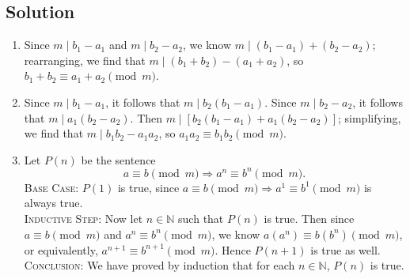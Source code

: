 \documentclass{article}
\begin{document}
\subsection*{Solution}
    \begin{enumerate}
        \item Since $m \mid b_1 - a_1$ and $m \mid b_2 - a_2$, we know $m \mid (b_1 - a_1) + (b_2 - a_2)$; rearranging, we find that $m \mid (b_1 + b_2) - (a_1 + a_2)$, so $b_1 + b_2 \equiv a_1 + a_2 \pmod m$.
        \item Since $m \mid b_1 - a_1$, it follows that $m \mid b_2(b_1 - a_1)$. Since $m \mid b_2 - a_2$, it follows that $m \mid a_1(b_2 - a_2)$. Then $m \mid [b_2(b_1 - a_1) + a_1(b_2 - a_2)]$; simplifying, we find that $m \mid b_1b_2 - a_1a_2$, so $a_1a_2 \equiv b_1b_2 \pmod{m}$.
        \item Let $P(n)$ be the sentence $$a \equiv b \pmod m \Rightarrow a^n \equiv b^n \pmod m.$$
        \textsc{Base Case}: $P(1)$ is true, since $a \equiv b \pmod m \Rightarrow a^1 \equiv b^1 \pmod m$ is always true. \\
        \textsc{Inductive Step}: Now let $n \in \mathbb{N}$ such that $P(n)$ is true. Then since $a \equiv b \pmod m$ and $a^n \equiv b^n \pmod m$, we know $a(a^n) \equiv b(b^n) \pmod m$, or equivalently, $a^{n + 1} \equiv b^{n + 1} \pmod m$. Hence $P(n + 1)$ is true as well. \\
        \textsc{Conclusion}: We have proved by induction that for each $n \in \mathbb{N}$, $P(n)$ is true.
    \end{enumerate}
    
\end{document}
